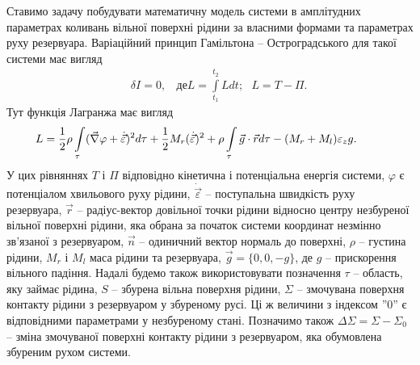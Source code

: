 \documentclass[11pt, reqno]{amsart}
\begin{document}
Ставимо задачу побудувати математичну модель системи в амплітудних параметрах коливань вільної поверхні рідини за власними формами та параметрах руху резервуара.
Варіаційний принцип Гамільтона -- Остроградського для такої системи має вигляд
\begin{eqnarray}\label{2}
   &&\delta I =0, \ \ \ \ де L=\int \limits_{t_1}^{t_2} Ldt; \ \ \ L=T- \Pi.
\end{eqnarray}
Тут функція Лагранжа має вигляд
\begin{eqnarray}\label{3}
  &&\hskip-12mmL=\frac{1}{2}\rho\int\limits_{\tau}({\vec\nabla}\varphi+\dot{\vec \varepsilon})^2 d\tau +\frac{1}{2}M_r(\dot{\vec\varepsilon})^2 +
      \rho\int\limits_\tau{\vec g}\cdot{\vec r}d\tau-(M_r+M_l)\varepsilon_z g.
\end{eqnarray}
У цих рівняннях $T$ і $\Pi$ відповідно кінетична і потенціальна енергія системи, $\varphi$ є потенціалом хвильового руху рідини, $\dot{\vec \varepsilon}$ -- поступальна швидкість руху резервуара, $\vec r$ -- радіус-вектор довільної точки рідини відносно центру незбуреної вільної поверхні рідини, яка обрана за початок системи координат незмінно зв'язаної з резервуаром, $\vec n$ -- одиничний вектор нормаль до поверхні,  $\rho$ -- густина рідини, $M_r$ і $M_l$ маса рідини та резервуара, ${\vec g} = \{ 0,0,-g \}$, де $g$ -- прискорення вільного падіння. Надалі будемо також використовувати позначення $\tau$ -- область, яку займає рідина, $S$ -- збурена вільна поверхня рідини, $\Sigma$ -- змочувана поверхня контакту рідини з резервуаром у збуреному русі. Ці ж величини з індексом  ''0''  є відповідними параметрами у незбуреному стані. Позначимо також  $\Delta \Sigma =\Sigma - \Sigma_0$ -- зміна змочуваної поверхні контакту рідини з резервуаром, яка обумовлена збуреним рухом системи. 
\end{document}
